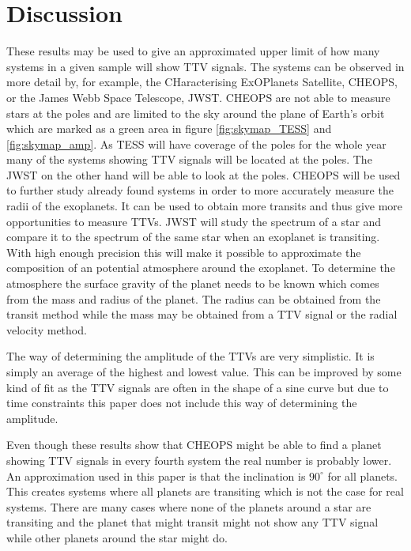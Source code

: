 \documentclass[12pt]{report}
\begin{document}

\chapter{Discussion}
	These results may be used to give an approximated upper limit of how many systems in a given sample will show TTV signals. The systems can be observed in more detail by, for example, the CHaracterising ExOPlanets Satellite, CHEOPS, or the James Webb Space Telescope, JWST. CHEOPS are not able to measure stars at the poles and are limited to the sky around the plane of Earth's orbit which are marked as a green area in figure \ref{fig:skymap_TESS} and \ref{fig:skymap_amp}. As TESS will have coverage of the poles for the whole year many of the systems showing TTV signals will be located at the poles. The JWST on the other hand will be able to look at the poles. CHEOPS will be used to further study already found systems in order to more accurately measure the radii of the exoplanets. It can be used to obtain more transits and thus give more opportunities to measure TTVs. JWST will study the spectrum of a star and compare it to the spectrum of the same star when an exoplanet is transiting. With high enough precision this will make it possible to approximate the composition of an potential atmosphere around the exoplanet. To determine the atmosphere the surface gravity of the planet needs to be known which comes from the mass and radius of the planet. The radius can be obtained from the transit method while the mass may be obtained from a TTV signal or the radial velocity method.
	
	The way of determining the amplitude of the TTVs are very simplistic. It is simply an average of the highest and lowest value. This can be improved by some kind of fit as the TTV signals are often in the shape of a sine curve but due to time constraints this paper does not include this way of determining the amplitude.
	
	Even though these results show that CHEOPS might be able to find a planet showing TTV signals in every fourth system the real number is probably lower. An approximation used in this paper is that the inclination is $90^{\circ}$ for all planets. This creates systems where all planets are transiting which is not the case for real systems. There are many cases where none of the planets around a star are transiting and the planet that might transit might not show any TTV signal while other planets around the star might do.
	
\end{document}
